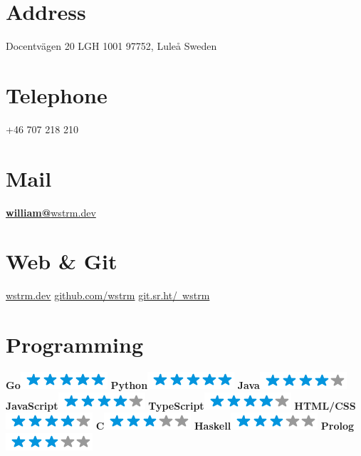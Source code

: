 \documentclass[]{friggeri-cv}
\begin{document}

\begin{aside}
  \section{Address}
    Docentvägen 20
    LGH 1001
    97752, Luleå
    Sweden
    ~
  \section{Telephone}
    +46 707 218 210
    ~
  \section{Mail}
    \href{mailto:william@wstrm.dev}{\textbf{william@}wstrm.dev}
    ~
  \section{Web \& Git}
    \href{https://wstrm.dev}{wstrm.dev}
    \href{https://github.com/wstrm}{github.com/wstrm}
    \href{https://git.sr.ht/%7Ewstrm/}{git.sr.ht/~wstrm}
    ~
  \section{Programming}
    \textbf{Go}\includegraphics[scale=0.40]{img/5stars.png}
    \textbf{Python}\includegraphics[scale=0.40]{img/5stars.png}
    \textbf{Java}\includegraphics[scale=0.40]{img/4stars.png}
    \textbf{JavaScript}\includegraphics[scale=0.40]{img/4stars.png}
    \textbf{TypeScript}\includegraphics[scale=0.40]{img/4stars.png}
    \textbf{HTML/CSS}\includegraphics[scale=0.40]{img/4stars.png}
    \textbf{C}\includegraphics[scale=0.40]{img/3stars.png}
    \textbf{Haskell}\includegraphics[scale=0.40]{img/3stars.png}
    \textbf{Prolog}\includegraphics[scale=0.40]{img/3stars.png}
    ~

\end{aside}
\end{document}
